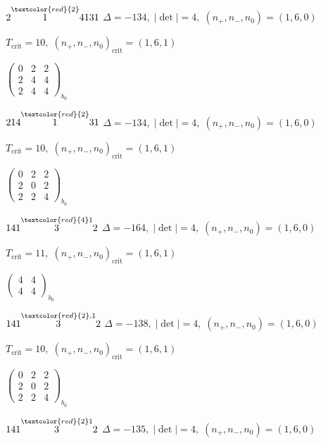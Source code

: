 \documentclass[10pt]{article}
\begin{document}
$2\overset{\textcolor{red}{2}}{1}4131$ \quad $\Delta=-134,\; |\det|=4,\; (n_+,n_-,n_0)=(1,6,0)$

\hspace{1em}$T_{\text{crit}}=10,\; (n_+,n_-,n_0)_{\text{crit}}=(1,6,1)$

\hspace{2em}$\left(\begin{smallmatrix}0 & 2 & 2 \\ 2 & 4 & 4 \\ 2 & 4 & 4\end{smallmatrix}\right)_{\!b_0}$

$214\overset{\textcolor{red}{2}}{1}31$ \quad $\Delta=-134,\; |\det|=4,\; (n_+,n_-,n_0)=(1,6,0)$

\hspace{1em}$T_{\text{crit}}=10,\; (n_+,n_-,n_0)_{\text{crit}}=(1,6,1)$

\hspace{2em}$\left(\begin{smallmatrix}0 & 2 & 2 \\ 2 & 0 & 2 \\ 2 & 2 & 4\end{smallmatrix}\right)_{\!b_0}$

\smallskip

$141\overset{\textcolor{red}{4}1}{3}2$ \quad $\Delta=-164,\; |\det|=4,\; (n_+,n_-,n_0)=(1,6,0)$

\hspace{1em}$T_{\text{crit}}=11,\; (n_+,n_-,n_0)_{\text{crit}}=(1,6,1)$

\hspace{2em}$\left(\begin{smallmatrix}4 & 4 \\ 4 & 4\end{smallmatrix}\right)_{\!b_0}$

$141\overset{\textcolor{red}{2},1}{3}2$ \quad $\Delta=-138,\; |\det|=4,\; (n_+,n_-,n_0)=(1,6,0)$

\hspace{1em}$T_{\text{crit}}=10,\; (n_+,n_-,n_0)_{\text{crit}}=(1,6,1)$

\hspace{2em}$\left(\begin{smallmatrix}0 & 2 & 2 \\ 2 & 0 & 2 \\ 2 & 2 & 4\end{smallmatrix}\right)_{\!b_0}$

$141\overset{\textcolor{red}{2}1}{3}2$ \quad $\Delta=-135,\; |\det|=4,\; (n_+,n_-,n_0)=(1,6,0)$
\end{document}

